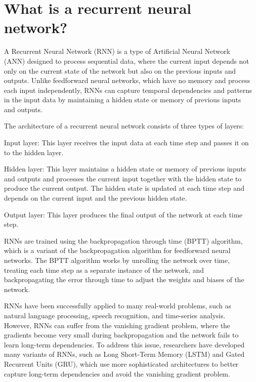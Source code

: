 \section{What is a recurrent neural network?}
A Recurrent Neural Network (RNN) is a type of Artificial Neural Network (ANN) designed to process sequential data, where the current input depends not only on the current state of the network but also on the previous inputs and outputs. Unlike feedforward neural networks, which have no memory and process each input independently, RNNs can capture temporal dependencies and patterns in the input data by maintaining a hidden state or memory of previous inputs and outputs.

The architecture of a recurrent neural network consists of three types of layers:

Input layer: This layer receives the input data at each time step and passes it on to the hidden layer.

Hidden layer: This layer maintains a hidden state or memory of previous inputs and outputs and processes the current input together with the hidden state to produce the current output. The hidden state is updated at each time step and depends on the current input and the previous hidden state.

Output layer: This layer produces the final output of the network at each time step.

RNNs are trained using the backpropagation through time (BPTT) algorithm, which is a variant of the backpropagation algorithm for feedforward neural networks. The BPTT algorithm works by unrolling the network over time, treating each time step as a separate instance of the network, and backpropagating the error through time to adjust the weights and biases of the network.

RNNs have been successfully applied to many real-world problems, such as natural language processing, speech recognition, and time-series analysis. However, RNNs can suffer from the vanishing gradient problem, where the gradients become very small during backpropagation and the network fails to learn long-term dependencies. To address this issue, researchers have developed many variants of RNNs, such as Long Short-Term Memory (LSTM) and Gated Recurrent Units (GRU), which use more sophisticated architectures to better capture long-term dependencies and avoid the vanishing gradient problem.

